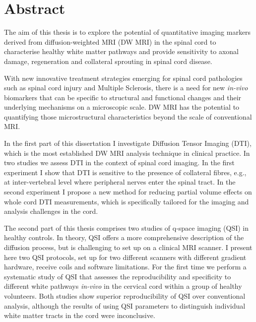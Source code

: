

\begingroup
\let\clearpage\relax
\let\cleardoublepage\relax
\let\cleardoublepage\relax

\chapter*{Abstract} %
{\normalsize
The aim of this thesis is to explore the potential of quantitative imaging markers derived from diffusion-weighted MRI (DW MRI) in the spinal cord to characterise healthy white matter pathways and provide sensitivity to axonal damage, regeneration and collateral sprouting in spinal cord disease. 


With new innovative treatment strategies emerging for spinal cord pathologies such as spinal cord injury and Multiple Sclerosis, there is a need for new \emph{in-vivo} biomarkers that can be specific to structural and functional changes and their underlying mechanisms on a microscopic scale. DW MRI has the potential to quantifying those microstructural characteristics beyond the scale of  conventional MRI.


In the first part of this dissertation I investigate Diffusion Tensor Imaging (DTI), which is the most established DW MRI analysis technique in clinical practice. In two studies we assess DTI in the context of spinal cord imaging. In the first experiment I show that DTI is sensitive to the presence of collateral fibres, e.g., at inter-vertebral level where peripheral nerves enter the spinal tract. In the second experiment I propose a new method for reducing partial volume effects on whole cord DTI measurements, which is specifically tailored for the imaging and analysis challenges in the cord. 


The second part of this thesis comprises two studies of q-space imaging (QSI) in healthy controls. In theory, QSI offers a more comprehensive description of the diffusion process, but is challenging to set up on a clinical MRI scanner. I present here two QSI protocols, set up for two different scanners with different gradient hardware, receive coils and software limitations. For the first time we perform a systematic study of QSI that assesses the reproducibility and specificity to different white pathways \emph{in-vivo} in the cervical cord within a group of healthy volunteers. Both studies show superior reproducibility of QSI over conventional analysis, although the results of using QSI parameters to distinguish individual white matter tracts in the cord were inconclusive.


}
